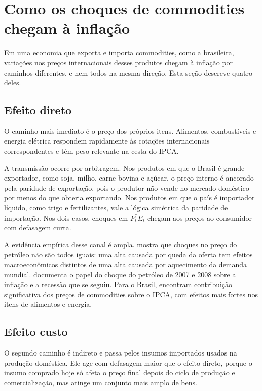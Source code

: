 \documentclass[12pt,openright,oneside,a4paper,portuguese,brazil]{abntex2}
\begin{document}
\section{Como os choques de commodities chegam à inflação}
\label{sec:commodities}

Em uma economia que exporta e importa commodities, como a brasileira, variações
nos preços internacionais desses produtos chegam à inflação por caminhos
diferentes, e nem todos na mesma direção. Esta seção descreve quatro deles.

\subsection{Efeito direto}
\label{sec:efeitodireto}

O caminho mais imediato é o preço dos próprios itens. Alimentos, combustíveis e
energia elétrica respondem rapidamente às cotações internacionais
correspondentes e têm peso relevante na cesta do IPCA.

A transmissão ocorre por arbitragem. Nos produtos em que o Brasil é grande
exportador, como soja, milho, carne bovina e açúcar, o preço interno é ancorado
pela paridade de exportação, pois o produtor não vende no mercado doméstico por
menos do que obteria exportando. Nos produtos em que o país é importador
líquido, como trigo e fertilizantes, vale a lógica simétrica da paridade de
importação. Nos dois casos, choques em $P^{*}_{t} E_{t}$ chegam aos preços ao
consumidor com defasagem curta.

A evidência empírica desse canal é ampla.  mostra que
choques no preço do petróleo não são todos iguais: uma alta causada por queda da
oferta tem efeitos macroeconômicos distintos de uma alta causada por aquecimento
da demanda mundial.  documenta o papel do choque do
petróleo de 2007 e 2008 sobre a inflação e a recessão que se seguiu. Para o
Brasil,  encontram contribuição significativa dos
preços de commodities sobre o IPCA, com efeitos mais fortes nos itens de
alimentos e energia.

\subsection{Efeito custo}
\label{sec:efeitocusto}

O segundo caminho é indireto e passa pelos insumos importados usados na produção
doméstica. Ele age com defasagem maior que o efeito direto, porque o insumo
comprado hoje só afeta o preço final depois do ciclo de produção e
comercialização, mas atinge um conjunto mais amplo de bens.
\end{document}
